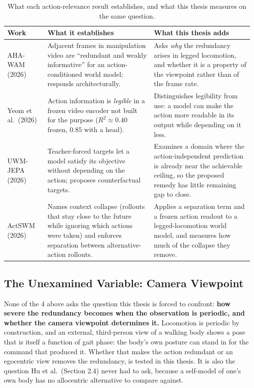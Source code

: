 \documentclass[12pt,a4paper,oneside]{report}
\begin{document}
\begin{table}[H]
\centering
\footnotesize
\setlength{\tabcolsep}{4pt}
\caption{What each action-relevance result establishes, and what this thesis measures on the same
question.}
\label{tab:action-relevance}
\begin{tabularx}{\textwidth}{>{\hsize}Y>{\hsize}Y>{\hsize}Y}
\toprule
\textbf{Work} & \textbf{What it establishes} & \textbf{What this thesis adds}\\
\midrule
AHA-WAM (2026) & Adjacent frames in manipulation video are ``redundant and weakly informative'' for an
  action-conditioned world model; responds architecturally. & Asks \emph{why} the redundancy arises in
  legged locomotion, and whether it is a property of the viewpoint rather than of the frame rate.\\
Yeom et al.\ (2026) & Action information is \emph{legible} in a frozen video encoder not built for the
  purpose ($R^2\!\approx\!0.40$ frozen, $0.85$ with a head). & Distinguishes legibility from use: a
  model can make the action more readable in its output while depending on it less.\\
UWM-JEPA (2026) & Teacher-forced targets let a model satisfy its objective without depending on the
  action; proposes counterfactual targets. & Examines a domain where the action-independent prediction
  is already near the achievable ceiling, so the proposed remedy has little remaining gap to close.\\
ActSWM (2026) & Names context collapse (rollouts that stay close to the future while ignoring which actions were
  taken) and enforces separation between alternative-action rollouts. & Applies a separation term and a frozen
  action readout to a legged-locomotion world model, and measures how much of the collapse they remove.\\
\bottomrule
\end{tabularx}
\end{table}

\subsection{The Unexamined Variable: Camera Viewpoint}
None of the 4 above asks the question this thesis is forced to confront: \textbf{how
severe the redundancy becomes when the observation is periodic, and whether the camera viewpoint
determines it.} Locomotion is periodic by construction, and an external, third-person view of a
walking body shows a pose that is itself a function of gait phase: the body's own posture can stand
in for the command that produced it. Whether that makes the action redundant or
an egocentric view removes the redundancy, is tested in this thesis.
It is also the question Hu et al.\ (Section 2.4) never had to ask, because a self-model of one's own
body has no allocentric alternative to compare against.
\end{document}
